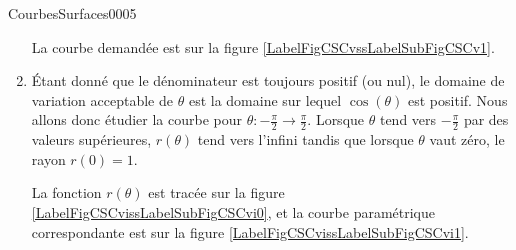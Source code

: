 \begin{corrige}{CourbesSurfaces0005}
\begin{enumerate}
			La courbe demandée est sur la figure \ref{LabelFigCSCvssLabelSubFigCSCv1}.

		\item

\newcommand{\CaptionFigCSCvi}{La courbe de l'exercice \ref{exoCourbesSurfaces0005}.\ref{CSCv}.}



			Étant donné que le dénominateur est toujours positif (ou nul), le domaine de variation acceptable de $\theta$ est la domaine sur lequel $\cos(\theta)$ est positif. Nous allons donc étudier la courbe pour $\theta\colon -\frac{ \pi }{2}\to \frac{ \pi }{2}$. Lorsque $\theta$ tend vers $-\frac{ \pi }{2}$ par des valeurs supérieures, $r(\theta)$ tend vers l'infini tandis que lorsque $\theta$ vaut zéro, le rayon $r(0)=1$.

		La fonction $r(\theta)$ est tracée sur la figure \ref{LabelFigCSCvissLabelSubFigCSCvi0}, et la courbe paramétrique correspondante est sur la figure \ref{LabelFigCSCvissLabelSubFigCSCvi1}.

	\end{enumerate}
	
\end{corrige}

\clearpage
